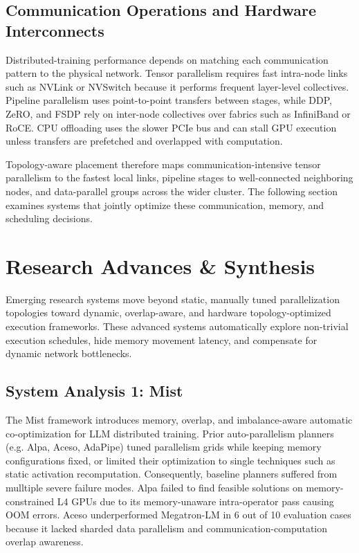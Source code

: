 \documentclass[11pt,journal,final, onecolumn]{IEEEtran}
\begin{document}
\subsection{Communication Operations and Hardware Interconnects}
\label{subsec:hardware-interconnects}

Distributed-training performance depends on matching each communication
pattern to the physical network. Tensor parallelism requires fast intra-node
links such as NVLink or NVSwitch because it performs frequent layer-level
collectives. Pipeline parallelism uses point-to-point transfers between
stages, while DDP, ZeRO, and FSDP rely on inter-node collectives over fabrics
such as InfiniBand or RoCE. CPU offloading uses the slower PCIe bus and can
stall GPU execution unless transfers are prefetched and overlapped with
computation.

Topology-aware placement therefore maps communication-intensive tensor
parallelism to the fastest local links, pipeline stages to well-connected
neighboring nodes, and data-parallel groups across the wider cluster. The
following section examines systems that jointly optimize these communication,
memory, and scheduling decisions.


\section{Research Advances \& Synthesis}

Emerging research systems move beyond static, manually tuned parallelization topologies toward dynamic, overlap-aware, and hardware topology-optimized execution frameworks. These advanced systems automatically explore non-trivial execution schedules, hide memory movement latency, and compensate for dynamic network bottlenecks.

\subsection{System Analysis 1: Mist}
The Mist framework \cite{Zhu_2025} introduces memory, overlap, and imbalance-aware automatic co-optimization for LLM distributed training. Prior auto-parallelism planners (e.g. Alpa, Aceso, AdaPipe) tuned parallelism grids while keeping memory configurations fixed, or limited their optimization to single techniques such as static activation recomputation. Consequently, baseline planners suffered from mulltiple severe failure modes. Alpa failed to find feasible solutions on memory-constrained L4 GPUs due to its memory-unaware intra-operator pass causing OOM errors. Aceso underperformed Megatron-LM in 6 out of 10 evaluation cases because it lacked sharded data parallelism and communication-computation overlap awareness.
\end{document}
